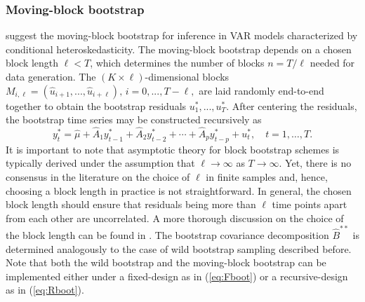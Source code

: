 \documentclass[nojss]{jss}\usepackage[]{graphicx}\usepackage[]{color}
\begin{document}
\subsubsection*{Moving-block bootstrap}\label{sec:mbboot}
\cite{BJT2016} suggest the moving-block bootstrap for inference in VAR models characterized by conditional heteroskedasticity. The moving-block bootstrap  depends on a chosen block length $\ell < T$, which determines the number of blocks $n = T/\ell$ needed for data generation. The $(K \times \ell)$-dimensional blocks $M_{i,\ell} = (\widehat{u}_{i+1},...,\widehat{u}_{i+\ell}),\, i = 0,...,T-\ell,$ are laid randomly end-to-end together to obtain the bootstrap residuals $u^*_1,...,u^*_T$. After centering the residuals, the bootstrap time series may be constructed recursively as
\begin{equation}\label{eq:Rboot}
y^*_t = \widehat{\mu} + \widehat{A}_1 y^*_{t-1} + \widehat{A}_2 y^*_{t-2}  + \cdots + \widehat{A}_p y^*_{t-p} +  u^*_t, \quad t=1,\ldots,T.
\end{equation} \label{varboot2}
It is important to note that asymptotic theory for block bootstrap schemes is typically derived under the assumption that $\ell \rightarrow \infty$ as $T \rightarrow \infty$. Yet, there is no consensus in the literature on the choice of $\ell$ in finite samples and, hence, choosing a block length in practice is not straightforward. In general, the chosen block length should ensure that residuals being more than $\ell$ time points apart from each other are uncorrelated. A more thorough discussion on the choice of the block length can be found in \cite{Lahiri2003}. The bootstrap covariance decomposition $\widehat{B}^{**}$ is determined analogously to the case of wild bootstrap sampling described before.  Note that both the wild bootstrap and the moving-block bootstrap can be implemented either under a fixed-design as in (\ref{eq:Fboot}) or a recursive-design as in (\ref{eq:Rboot}).
\end{document}
